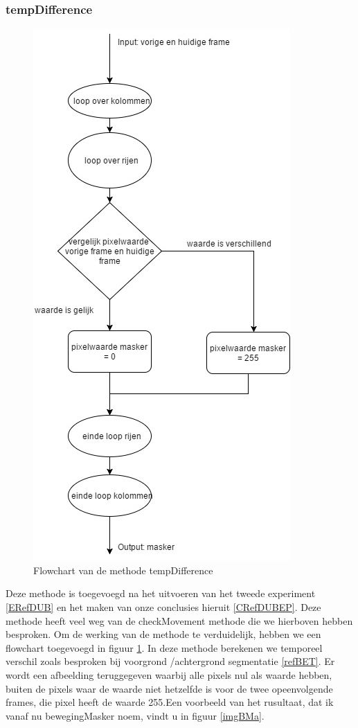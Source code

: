 \subsubsection{tempDifference}
\begin{figure}[hbp]
	\includegraphics[scale=0.45]{FlowChart_TempDifference}
	\caption{Flowchart van de methode tempDifference}
	\label{imgFCTDi}
\end{figure}
Deze methode is toegevoegd na het uitvoeren van het tweede experiment \ref{ERefDUB} en het maken van onze conclusies hieruit \ref{CRefDUBEP}. Deze methode heeft veel weg van de checkMovement methode die we hierboven hebben besproken. Om de werking van de methode te verduidelijk, hebben we een flowchart toegevoegd in figuur \ref{imgFCTDi}. In deze methode berekenen we temporeel verschil zoals besproken bij voorgrond /achtergrond segmentatie \ref{refBET}. Er wordt een afbeelding teruggegeven waarbij alle pixels nul als waarde hebben, buiten de pixels waar de waarde niet hetzelfde is voor de twee opeenvolgende frames, die pixel heeft de waarde 255.Een voorbeeld van het rusultaat, dat ik vanaf nu bewegingMasker noem, vindt u in figuur \ref{imgBMa}. \\
